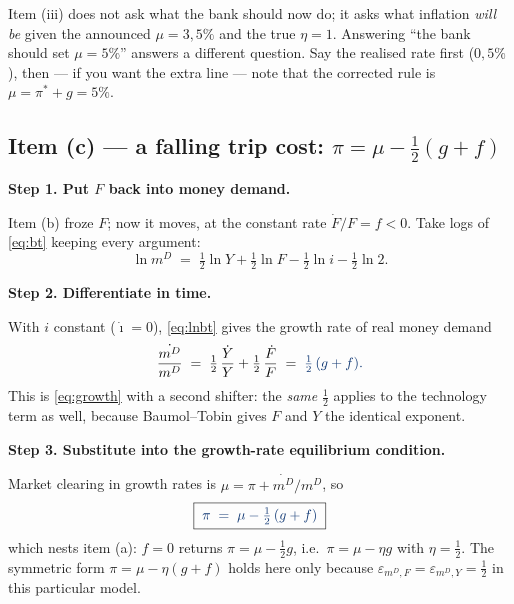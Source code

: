 \documentclass[11pt, a4paper]{article}
\newcommand{\passo}[1]{\medskip\noindent\textbf{#1}\par\nobreak}
\newcommand{\resp}[1]{%
  \ifmmode {\color{darkblue}#1}\else\textcolor{darkblue}{\textbf{#1}}\fi}
\newcommand{\md}{m^{D}}
\begin{document}
\begin{tcolorbox}[trapbox, title={The trap: re-optimising $\mu$ after learning the truth}]
\small
Item (iii) does not ask what the bank should now do; it asks what inflation \emph{will be}
given the announced $\mu=3{,}5\%$ and the true $\eta=1$. Answering ``the bank should set
$\mu=5\%$'' answers a different question. Say the realised rate first ($0{,}5\%$), then --- if
you want the extra line --- note that the corrected rule is $\mu=\pi^{\ast}+g=5\%$.
\end{tcolorbox}

\subsection*{Item (c) --- a falling trip cost: $\pi=\mu-\tfrac12(g+f)$}

\passo{Step 1. Put $F$ back into money demand.}
Item (b) froze $F$; now it moves, at the constant rate $\dot F/F=f<0$. Take logs of
\eqref{eq:bt} keeping every argument:
\begin{equation}
\ln \md \;=\; \tfrac12\ln Y + \tfrac12\ln F - \tfrac12\ln i - \tfrac12\ln 2 .
\label{eq:lnbt}
\end{equation}

\passo{Step 2. Differentiate in time.}
With $i$ constant ($\dot\imath=0$), \eqref{eq:lnbt} gives the growth rate of real money demand
\begin{equation}
\frac{\dot{\md}}{\md} \;=\; \tfrac12\,\frac{\dot Y}{Y} + \tfrac12\,\frac{\dot F}{F}
\;=\; \resp{\tfrac12\,(g+f).}
\label{eq:mdot}
\end{equation}
This is \eqref{eq:growth} with a second shifter: the \emph{same} $\tfrac12$ applies to the
technology term as well, because Baumol--Tobin gives $F$ and $Y$ the identical exponent.

\passo{Step 3. Substitute into the growth-rate equilibrium condition.}
Market clearing in growth rates is $\mu=\pi+\dot{\md}/\md$, so
\begin{equation}
\boxed{\;\resp{\pi \;=\; \mu - \tfrac12\,(g+f)\;}}
\label{eq:pigf}
\end{equation}
which nests item (a): $f=0$ returns $\pi=\mu-\tfrac12 g$, i.e.\ $\pi=\mu-\eta g$ with
$\eta=\tfrac12$. The symmetric form $\pi=\mu-\eta(g+f)$ holds here only because
$\varepsilon_{\md,F}=\varepsilon_{\md,Y}=\tfrac12$ in this particular model.
\end{document}
